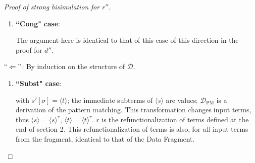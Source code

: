 \documentclass[11pt]{article} %
\begin{document}
\begin{proof}[Proof of strong bisimulation for $r''$]
\begin{enumerate}
\begin{itemize}
\item \underline{Case 3}: $q$ is hole pattern and has a first argument with data type:

Then the function definition that contains $`` q = s' "$ contains only equations where the left-hand side is a hole pattern (other cases are excluded by the relevant input fragment for $d''$), and it has a first argument with data type. Thus $s$ reduces to $t$ already with respect to the part of the program that is passed to $des\_conv$, and then the result of this to $r^{core}$, as specified in the definition of $r''$. Let the part passed to $des\_conv$ be $prg'$; it is: $s \longrightarrow_{prg'} t$.

By (*) we have

\begin{equation*}
s \longrightarrow_{prg'} t \iff \langle s \rangle \longrightarrow_{\langle prg' \rangle^{r^{core}}} \langle t \rangle,
\end{equation*}

But this program $\langle prg' \rangle^{r^{core}}$ is a subset of $\langle prg \rangle$, as can be seen in the definition of $r''$. Thus we have the desired $\langle s \rangle \longrightarrow_{\langle prg \rangle} \langle t \rangle$.

\end{itemize}

\item \textbf{``Cong" case}:

The argument here is identical to that of this case of this direction in the proof for $d''$.

\end{enumerate}

$`` \Leftarrow "$: By induction on the structure of $\mathcal{D}$.

\begin{enumerate}
\item \textbf{``Subst" case}:

\begin{prooftree}
\end{prooftree}

with $s'[\sigma] = \langle t \rangle$; the immediate subterms of $\langle s \rangle$ are values; $\mathcal{D}_{\textrm{PM}}$ is a derivation of the pattern matching. This transformation changes input terms, thus $\langle s \rangle = \langle s \rangle^r$, $\langle t \rangle = \langle t \rangle^r$. $r$ is the refunctionalization of terms defined at the end of section 2. This refunctionalization of terms is also, for all input terms from the fragment, identical to that of the Data Fragment.


\end{enumerate}
\end{proof}
\end{document}

